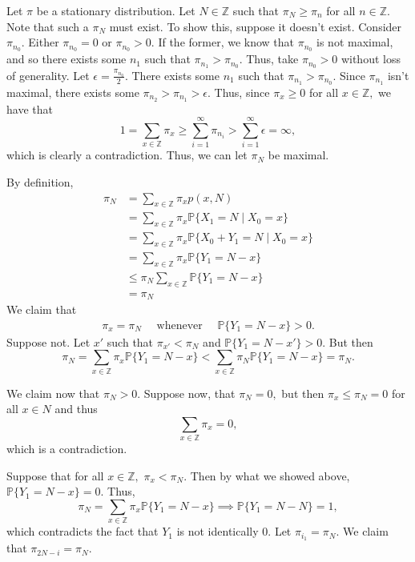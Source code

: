 \documentclass[11pt]{article}
\newcommand{\bbP}{\mathbb{P}}
\newcommand{\bbZ}{\mathbb{Z}}
\begin{document}
\begin{solution}
    Let $\pi$ be a stationary distribution. Let $N \in \bbZ$ such that $\pi_N \geq \pi_n$ for all $n \in \bbZ$. Note that such a $\pi_N$ must exist. To show this, suppose it doesn't exist. Consider $\pi_{n_0}.$ Either $\pi_{n_0} = 0$ or $\pi_{n_0} >0.$ If the former, we know that $\pi_{n_0}$ is not maximal, and so there exists some $n_1$ such that $\pi_{n_1} > \pi_{n_0}.$ Thus, take $\pi_{n_0} >0$ without loss of generality. Let $\epsilon = \frac{\pi_{n_0}}{2}.$ There exists some $n_1$ such that $\pi_{n_1} >\pi_{n_0}.$ Since $\pi_{n_1}$ isn't maximal, there exists some $\pi_{n_2} >\pi_{n_1} > \epsilon.$ Thus, since $\pi_x \geq 0$ for all $x\in \bbZ,$ we have that  
    \[1 = \sum_{x \in \bbZ}\pi_x \geq \sum_{i = 1}^\infty \pi_{n_i} > \sum_{i=1}^\infty \epsilon  = \infty,\] which is clearly a contradiction. Thus, we can let $\pi_N$ be maximal.

    By definition,
    \begin{align*}
        \pi_N &= \sum_{x\in \bbZ} \pi_x p(x,N)\\
        &= \sum_{x \in \bbZ} \pi_x\bbP\{X_1 = N \mid X_0 = x\}\\
        &= \sum_{x \in \bbZ} \pi_x\bbP\{X_0 + Y_1 = N \mid X_0 = x\}\\
        &= \sum_{x\in \bbZ}\pi_x \bbP\{Y_1 = N-x\}\\
        &\leq \pi_N \sum_{x\in \bbZ}\bbP\{Y_1 = N-x\}\\
        &= \pi_N
    \end{align*}
We claim that 
\begin{align}
    \pi_x = \pi_N \quad \text{ whenever }\quad  \bbP\{Y_1 = N -x\} >0.
\end{align}
 Suppose not. Let $x'$ such that $\pi_{x'} < \pi_N$ and $\bbP\{Y_1 = N - x'\} >0.$ But then 
\[\pi_N = \sum_{x\in \bbZ} \pi_x \bbP\{Y_1 = N - x\} < \sum_{x\in \bbZ}\pi_N \bbP\{Y_1 = 
 N-x\} = \pi_N.\] 

 We claim now that $\pi_N >0.$ Suppose now, that $\pi_N = 0,$ but then $\pi_x \leq \pi_N = 0$ for all $x\in N$ and thus 
 \[\sum_{x\in \bbZ}\pi_x = 0,\] which is a contradiction. 

 Suppose that for all $x\in \bbZ,$ $\pi_x < \pi_N.$ Then by what we showed above, $\bbP\{Y_1 = N-x\} = 0.$ Thus, 
 \[\pi_N = \sum_{x\in \bbZ}\pi_x \bbP\{Y_1 = N-x\} \implies \bbP\{Y_1 = N-N\} = 1,\] which contradicts the fact that $Y_1$ is not identically $0.$ Let $\pi_{i_1}= \pi_N.$ We claim that $\pi_{2N - i} = \pi_{N}.$ 
 

\end{solution}
\end{document}
